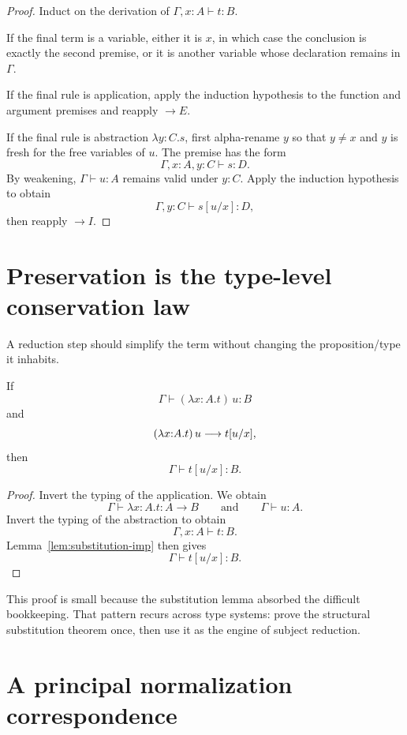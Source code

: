\begin{proof}
Induct on the derivation of $\Gamma,x{:}A\vdash t:B$.

If the final term is a variable, either it is $x$, in which case the conclusion is exactly the second premise, or it is another variable whose declaration remains in $\Gamma$.

If the final rule is application, apply the induction hypothesis to the function and argument premises and reapply $\to E$.

If the final rule is abstraction $\lambda y{:}C.s$, first alpha-rename $y$ so that $y\neq x$ and $y$ is fresh for the free variables of $u$. The premise has the form
\[
 \Gamma,x{:}A,y{:}C\vdash s:D.
\]
By weakening, $\Gamma\vdash u:A$ remains valid under $y{:}C$. Apply the induction hypothesis to obtain
\[
 \Gamma,y{:}C\vdash s[u/x]:D,
\]
then reapply $\to I$.
\end{proof}

\section{Preservation is the type-level conservation law}

A reduction step should simplify the term without changing the proposition/type it inhabits.

\begin{theorem}
\label{thm:preservation-imp}
If
\[
 \Gamma\vdash (\lambda x{:}A.t)\,u:B
\]
and
\[
 (\lambda x{:}A.t)\,u\mathrel{\longrightarrow} t[u/x],
\]
then
\[
 \Gamma\vdash t[u/x]:B.
\]
\end{theorem}

\begin{proof}
Invert the typing of the application. We obtain
\[
 \Gamma\vdash \lambda x{:}A.t:A\to B
 \qquad\text{and}\qquad
 \Gamma\vdash u:A.
\]
Invert the typing of the abstraction to obtain
\[
 \Gamma,x{:}A\vdash t:B.
\]
Lemma~\ref{lem:substitution-imp} then gives
\[
 \Gamma\vdash t[u/x]:B.
\]
\end{proof}

This proof is small because the substitution lemma absorbed the difficult bookkeeping. That pattern recurs across type systems: prove the structural substitution theorem once, then use it as the engine of subject reduction.



\section{A principal normalization correspondence}

